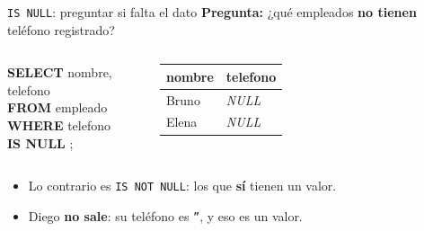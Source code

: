\documentclass[aspectratio=169,10pt,c]{beamer}
\newcommand{\kw}[1]{\textcolor{utpRojo}{\textbf{#1}}}
\newcommand{\nuevo}[1]{{%
  \setlength{\fboxsep}{1.2pt}%
  \begingroup
  \renewcommand{\kw}[1]{\textcolor{utpNegro}{\textbf{##1}}}%
  \colorbox{yellow!45}{\textcolor{utpNegro}{#1}}%
  \endgroup}}
\newcommand{\nulo}{\textcolor{utpGrisMedio}{\textit{NULL}}}
\newenvironment{sqlcode}[1][.86\textwidth]
  {\begin{center}\begin{lrbox}{\sqlbuf}\begin{minipage}{#1}\ttfamily\footnotesize\vspace{6pt}\raggedright}
  {\vspace{6pt}\end{minipage}\end{lrbox}\colorbox{utpGrisClaro}{\usebox{\sqlbuf}}\end{center}}
\newcommand{\cab}[1]{\normalfont\bfseries #1}
\newcommand{\res}[3]{%
  \centering{\scriptsize\color{utpGris}resultado}\\[3pt]
  \footnotesize\ttfamily
  \begin{tabular}{#1}
  \toprule
  #2 \\
  \midrule
  #3
  \bottomrule
  \end{tabular}}
\begin{document}
\begin{frame}{\texttt{IS NULL}: preguntar si falta el dato}
\small \textbf{Pregunta:} ¿qué empleados \textbf{no tienen} teléfono registrado?
\vspace{0.05cm}
\begin{columns}[c,onlytextwidth]
\begin{sqlcode}[\textwidth]
\scriptsize
\kw{SELECT} nombre, telefono\\
\kw{FROM} empleado\\
\kw{WHERE} telefono \nuevo{\kw{IS NULL}};
\end{sqlcode}
\res{ll}{\cab{nombre} & \cab{telefono}}{%
  Bruno & \nulo \\
  Elena & \nulo \\}
\end{columns}
\vspace{0.2cm}
\begin{itemize}\setlength\itemsep{6pt}
  \item Lo contrario es \texttt{IS NOT NULL}: los que \textbf{sí} tienen un valor.
  \item Diego \textbf{no sale}: su teléfono es \texttt{''}, y eso es un valor.
\end{itemize}
\vspace{0.15cm}
\end{frame}
\end{document}
